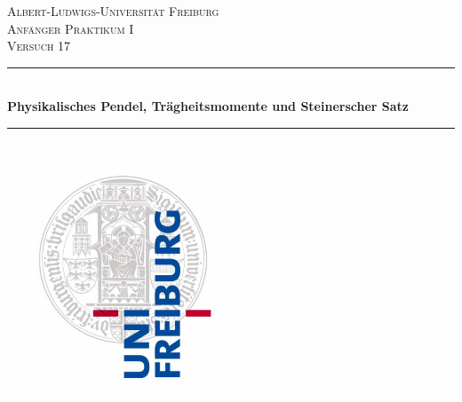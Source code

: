 \documentclass[11pt,a4paper]{article}
\begin{document}
\newcommand{\angstrom}{\mbox{\normalfont\AA}}
\newcommand*{\vertbar}{\rule[1ex]{0.5pt}{2.5ex}}
\newcommand*{\horzbar}{\rule[.5ex]{2.5ex}{0.5pt}}
\newcommand{\sg}{\vspace*{0.15cm}}
\newcommand{\pic}[4]{\begin{figure}[ht] \centering \texttt{[image: \#2]}\caption{#3}\label{#4}  
\end{figure}}
\newcommand{\picoc}[3]{\begin{figure}[ht] \centering \texttt{[image: \#2]}\label{#3}  
\end{figure}}

\begin{titlepage}

\newcommand{\HRule}{\rule{\linewidth}{0.5mm}} %

\center %
 

\textsc{\LARGE Albert-Ludwigs-Universität Freiburg}\\[1.5cm] %
\textsc{\Large Anfänger Praktikum I}\\[0.5cm] %
\textsc{\large Versuch 17}\\[0.5cm] %


\HRule \\[0.4cm]
{ \huge \bfseries   Physikalisches Pendel, Trägheitsmomente und Steinerscher Satz}\\[0.4cm] %
\HRule \\[1.5cm]


\includegraphics[width=200pt]{logo}\\[1cm]


\end{titlepage}
\end{document}
